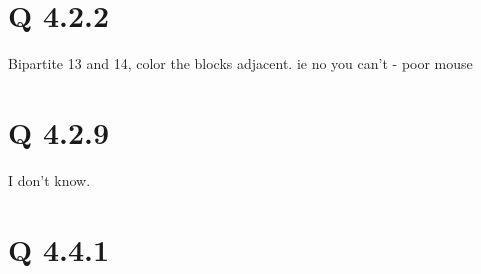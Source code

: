 \section{Q 4.2.2}
Bipartite 13 and 14, color the blocks adjacent. ie no you can't - poor mouse


\section{Q 4.2.9}
I don't know.

\section{Q 4.4.1}

